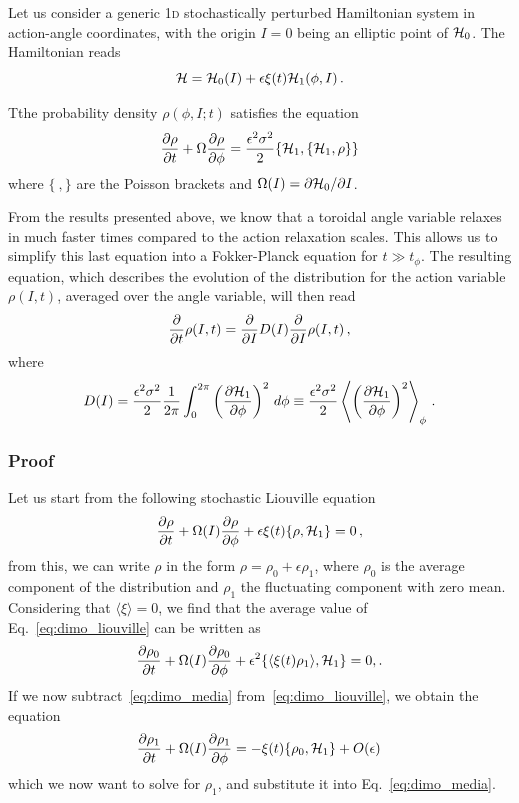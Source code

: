 Let us consider a generic 1\textsc{d} stochastically perturbed Hamiltonian system in action-angle coordinates, with the origin $I=0$ being an elliptic point of \(\mathcal{H}_0\). The Hamiltonian reads
\begin{equation}
	\mathcal{H} = \mathcal{H}_0(I) + \epsilon \xi(t) \mathcal{H}_1(\phi, I) \,.
\end{equation}

Tthe probability density \(\rho(\phi, I; t)\) satisfies the equation
\begin{equation}
	\pdv{\rho}{t}\/ + \Omega \pdv{\rho}{\phi}\/ = \frac{\epsilon^2 \sigma^2}{2}\{\mathcal{H}_1, \{\mathcal{H}_1,\rho\}\}
	\label{eq:stoc_ham_complex_starting}
\end{equation}
where \(\{\ ,\}\) are the Poisson brackets and \(\Omega(I) = \partial \mathcal{H}_0/\partial I\).

From the results presented above, we know that a toroidal angle variable relaxes in much faster times compared to the action relaxation scales. This allows us to simplify this last equation into a Fokker-Planck equation for \(t\gg t_{\phi}\). The resulting equation, which describes the evolution of the distribution for the action variable \(\rho(I,t)\), averaged over the angle variable, will then read
\begin{equation}
	\pdv{}{t}\/\rho(I,t) = \pdv{}{I}\/D(I)\pdv{}{I}\/\rho(I,t) \,,
\end{equation}
where
\begin{equation}
	D(I) = \frac{\epsilon^2 \sigma^2}{2}\frac{1}{2\pi}\int_0^{2\pi}\left(\pdv{\mathcal{H}_1}{\phi}\/\right)^2 \,d\phi \equiv \frac{\epsilon^2 \sigma^2}{2} \left\langle \left( \pdv{\mathcal{H}_1}{\phi}\/  \right)^2 \right\rangle_\phi \,.
\end{equation}

\subsubsection*{Proof}
Let us start from the following stochastic Liouville equation
\begin{equation}
	\pdv{\rho}{t}\/ + \Omega(I) \pdv{\rho}{\phi}\/ + \epsilon\xi(t)\{\rho,\mathcal{H}_1\} = 0\,,
	\label{eq:dimo_liouville}
\end{equation}
from this, we can write \(\rho\) in the form \(\rho = \rho_0 + \epsilon\rho_1\), where \(\rho_0\) is the average component of the distribution and \(\rho_1\) the fluctuating component with zero mean. Considering that \(\langle\xi\rangle = 0\), we find that the average value of Eq.~\eqref{eq:dimo_liouville} can be written as
\begin{equation}
	\pdv{\rho_0}{t}\/ + \Omega(I)\pdv{\rho_0}{\phi}\/ + \epsilon^2\{\langle\xi(t)\rho_1\rangle, \mathcal{H}_1\} = 0,.
	\label{eq:dimo_media}
\end{equation}
If we now subtract~\eqref{eq:dimo_media} from~\eqref{eq:dimo_liouville}, we obtain the equation
\begin{equation}
	\pdv{\rho_1}{t}\/ + \Omega(I) \pdv{\rho_1}{\phi}\/ = -\xi(t)\{\rho_0, \mathcal{H}_1\} + O(\epsilon)\,
\end{equation}
which we now want to solve for \(\rho_1\), and substitute it into Eq.~\eqref{eq:dimo_media}.

